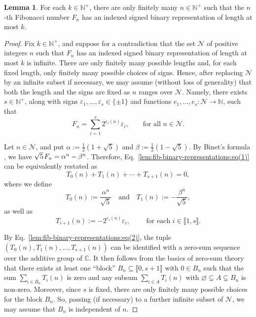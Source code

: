 \documentclass[11pt,reqno]{amsart}
\theoremstyle{definition}
\newtheorem{lemma}[theorem]{Lemma}
\theoremstyle{remark}
\theoremstyle{theoremdd}
\providecommand\llb{\llbracket}
\providecommand\rrb{\rrbracket}
\providecommand\llb{\llbracket}
\providecommand\rrb{\rrbracket}
\renewcommand{\emptyset}{\varnothing}
\renewcommand{\,}{\kern 0.1em}
\begin{document}
\begin{lemma}
\label{lem:fib-binary-representations}
For each $k \in \mathbb N^+$, there are only finitely many $n \in \mathbb N^+$ such that the $n$-th Fibonacci number $F_n$ has an indexed signed binary representation of length at most $k$.
\end{lemma}

\begin{proof}
Fix $k \in \mathbb N^+$, and suppose for a contradiction that the set $\mathcal N$ of positive integers $n$ such that $F_n$ has an indexed signed binary representation of length at most $k$ is infinite. 
There are only finitely many possible lengths and, for each fixed
length, only finitely many possible choices of signs. Hence,
after replacing $\mathcal N$ by an infinite subset if necessary, we may
assume (without loss of generality) that both the length and the signs are fixed as $n$ ranges over $\mathcal N$. Namely, there exists $s \in \mathbb N^+$, along with signs $\varepsilon_1, \ldots, \varepsilon_s \in \{\pm 1\}$ and functions $e_1, \ldots, e_s \colon \mathcal N \to \mathbb N$, such that
%
\begin{equation}
\label{lem:fib-binary-representations:eq(1)}
F_n = \sum_{i = 1}^s 2^{e_i(n)} \varepsilon_i,
\qquad\text{for all }
n \in \mathcal N.
\end{equation}

Let $n \in \mathcal N$, and put $\alpha := \frac{1}{2}(1+\sqrt5)$ and $\beta := \frac{1}{2}(1-\sqrt5)$. By Binet's formula \cite[p.~296]{Bur-2010}, we have $
\sqrt{5}\, F_n = \alpha^n - \beta^n$.
Therefore, Eq.~\eqref{lem:fib-binary-representations:eq(1)} can be equivalently restated as 
%
\begin{equation}
\label{lem:fib-binary-representations:eq(2)}
T_0(n) + T_1(n) + \cdots + T_{s+1}(n) = 0,
\end{equation}
where we define
\begin{equation}
\label{lem:fib-binary-representations:eq(1a)}
T_0(n) := \frac{\alpha^n}{\sqrt{5}}
\quad\text{and}\quad
T_1(n) := - \frac{\beta^n}{\sqrt{5}}, 
\end{equation}
as well as  
\begin{equation}
\label{lem:fib-binary-representations:eq(1b)}
T_{i+1}(n) := -2^{e_i(n)} \varepsilon_i, 
\qquad\text{ for each } 
i \in \llb 1, s \rrb.
\end{equation}

By Eq.~\eqref{lem:fib-binary-representations:eq(2)}, the tuple $
(T_0(n), T_1(n), \ldots, T_{s+1}(n))$
can be identified with a zero-sum sequence over the additive group of $\mathbb C$. It then follows from the basics of zero-sum theory \cite[Section 3.4]{Ger-HK-2006} that there exists at least one ``block'' $B_n \subseteq \llb 0, s + \allowbreak 1 \rrb$ with $0 \in B_n$ such that the sum $\sum_{i \in B_n} T_i(n)$ is zero and any subsum $\sum_{i \in A} T_i(n)$ with $\emptyset \subsetneq A \subsetneq B_n$ is non-zero.
Moreover, since $s$ is fixed, there are only finitely many possible choices for the block $B_n$. So, passing (if necessary) to a further infinite subset of $\mathcal N$, we may assume that $B_n$ is independent of $n$. 


\end{proof}
\end{document}
